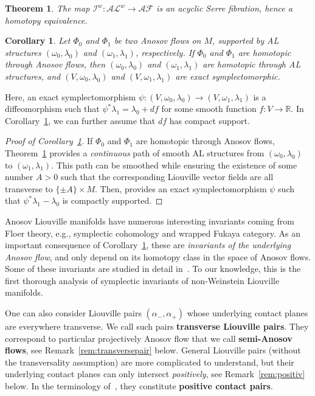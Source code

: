 \documentclass[letterpaper, 11pt]{article}
\numberwithin{equation}{section}
\newtheorem{thmintro}{Theorem}
\newtheorem{corintro}{Corollary}
\newcommand{\R}{\mathbb{R}}
\begin{document}
\begin{thmintro} \label{thmintro:louvstr}
The map $\mathcal{I}^w : \mathcal{AL}^w \rightarrow \mathcal{AF}$ is an acyclic Serre fibration, hence a homotopy equivalence.
\end{thmintro}

\begin{corintro} \label{cor} Let $\Phi_0$ and $\Phi_1$ be two Anosov flows on $M$, supported by AL structures $(\omega_0, \lambda_0)$ and $(\omega_1, \lambda_1)$, respectively. If $\Phi_0$ and $\Phi_1$ are homotopic through Anosov flows, then $(\omega_0, \lambda_0)$ and $(\omega_1, \lambda_1)$ are homotopic through AL structures, and $(V, \omega_0, \lambda_0)$ and $(V, \omega_1, \lambda_1)$ are exact symplectomorphic.
\end{corintro}

Here, an exact symplectomorphism $\psi : (V,\omega_0, \lambda_0) \rightarrow (V, \omega_1, \lambda_1)$ is a diffeomorphism such that $\psi^*\lambda_1 = \lambda_0 + df$ for some smooth function $f : V \rightarrow \R$. In Corollary~\ref{cor}, we can further assume that $df$ has compact support.

\begin{proof}[Proof of Corollary~\ref{cor}] If $\Phi_0$ and $\Phi_1$ are homotopic through Anosov flows, Theorem~\ref{thmintro:louvstr} provides a \emph{continuous} path of smooth AL structures from $(\omega_0, \lambda_0)$ to $(\omega_1, \lambda_1)$. This path can be smoothed while ensuring the existence of some number $A > 0$ such that the corresponding Liouville vector fields are all transverse to $\{\pm A\} \times M$. Then, \cite[Proposition 11.8]{CE12} provides an exact symplectomorphism $\psi$ such that $\psi^*\lambda_1 - \lambda_0$ is compactly supported.
\end{proof}

Anosov Liouville manifolds have numerous interesting invariants coming from Floer theory, e.g., symplectic cohomology and wrapped Fukaya category. As an important consequence of Corollary~\ref{cor}, these are \emph{invariants of the underlying Anosov flow}, and only depend on its homotopy class in the space of Anosov flows. Some of these invariants are studied in detail in~\cite{CLMM}. To our knowledge, this is the first thorough analysis of symplectic invariants of non-Weinstein Liouville manifolds.

\medskip

One can also consider Liouville pairs $(\alpha_-, \alpha_+)$ whose underlying contact planes are everywhere transverse. We call such pairs \textbf{transverse Liouville pairs}. They correspond to particular projectively Anosov flow that we call \textbf{semi-Anosov flows}, see Remark~\ref{rem:transversepair} below. General Liouville pairs (without the transversality assumption) are more complicated to understand, but their underlying contact planes can only intersect \emph{positively}, see Remark~\ref{rem:positiv} below. In the terminology of~\cite{CS11}, they constitute \textbf{positive contact pairs}. 
\end{document}
